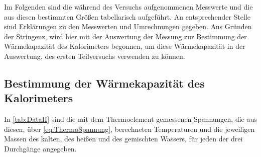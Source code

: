 Im Folgenden sind die während des Versuchs aufgenommenen Messwerte und die 
aus diesen bestimmten Größen tabellarisch aufgeführt. An entsprechender Stelle
sind Erklärungen zu den Messwerten und Umrechnungen gegeben.
Aus Gründen der Stringenz, wird hier mit der Auswertung der Messung zur Bestimmung der Wärmekapazität des Kalorimeters
begonnen, um diese Wärmekapazität in der Auswertung, des ersten Teilversuchs verwenden zu können.


\subsection{Bestimmung der Wärmekapazität des Kalorimeters}\label{sec:CM_Kalorimeter}
	In \autoref{tab:DataII} sind die mit dem Thermoelement gemessenen Spannungen, die aus diesen,
	über \eqref{eq:ThermoSpannung}, berechneten Temperaturen und die jeweiligen Massen des kalten,
	des heißen und des gemischten Wassers, für jeden der drei Durchgänge angegeben.
	
